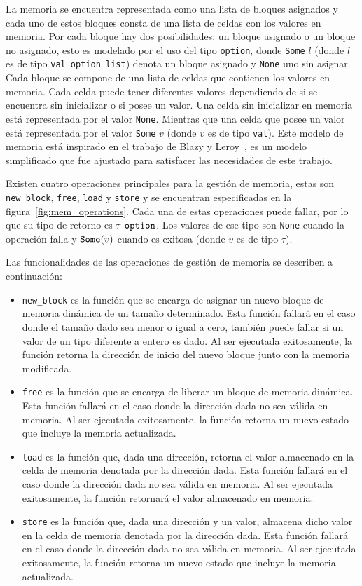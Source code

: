 La memoria se encuentra representada como una lista de bloques asignados y cada uno de estos bloques consta de una lista de celdas con los valores en memoria.
Por cada bloque hay dos posibilidades: un bloque asignado o un bloque no asignado, esto es modelado por el uso del tipo \verb|option|, donde \verb|Some| $l$ (donde $l$ es de tipo \verb|val option list|) denota un bloque asignado y \verb|None| uno sin asignar.
Cada bloque se compone de una lista de celdas que contienen los valores en memoria.
Cada celda puede tener diferentes valores dependiendo de si se encuentra sin inicializar o si posee un valor.
Una celda sin inicializar en memoria está representada por el valor \verb|None|.
Mientras que una celda que posee un valor está representada por el valor \verb|Some| $v$ (donde $v$ es de tipo \verb|val|).
Este modelo de memoria está inspirado en el trabajo de Blazy y Leroy~\citeyearpar{leroy-blazy-memory-model}, es un modelo simplificado que fue ajustado para satisfacer las necesidades de este trabajo.

Existen cuatro operaciones principales para la gestión de memoria, estas son \verb|new_block|, \verb|free|, \verb|load| y \verb|store| y se encuentran especificadas en la figura~\ref{fig:mem_operations}.
Cada una de estas operaciones puede fallar, por lo que su tipo de retorno es $\tau\ \verb|option|$.
Los valores de ese tipo son \verb|None| cuando la operación falla y $\verb|Some|(v)$ cuando es exitosa (donde $v$ es de tipo $\tau$).

Las funcionalidades de las operaciones de gestión de memoria se describen a continuación:

\begin{itemize}
  \item{\verb|new_block| es la función que se encarga de asignar un nuevo bloque de memoria dinámica de un tamaño determinado.
    Esta función fallará en el caso donde el tamaño dado sea menor o igual a cero, también puede fallar si un valor de un tipo diferente a entero es dado.
    Al ser ejecutada exitosamente, la función retorna la dirección de inicio del nuevo bloque junto con la memoria modificada.}
  \item{\verb|free| es la función que se encarga de liberar un bloque de memoria dinámica.
    Esta función fallará en el caso donde la dirección dada no sea válida en memoria.
    Al ser ejecutada exitosamente, la función retorna un nuevo estado que incluye la memoria actualizada.}
  \item{\verb|load| es la función que, dada una dirección, retorna el valor almacenado en la celda de memoria denotada por la dirección dada.
    Esta función fallará en el caso donde la dirección dada no sea válida en memoria.
    Al ser ejecutada exitosamente, la función retornará el valor almacenado en memoria.}
  \item{\verb|store| es la función que, dada una dirección y un valor, almacena dicho valor en la celda de memoria denotada por la dirección dada.
    Esta función fallará en el caso donde la dirección dada no sea válida en memoria.
    Al ser ejecutada exitosamente, la función retorna un nuevo estado que incluye la memoria actualizada.}
\end{itemize}

